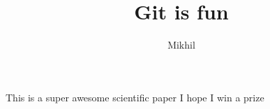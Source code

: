 \documentclass[10pt]{article}
\author{Mikhil}
\title{Git is fun}
\begin{document}
        \maketitle

        This is a super awesome scientific paper
        I hope I win a prize
\end{document}
